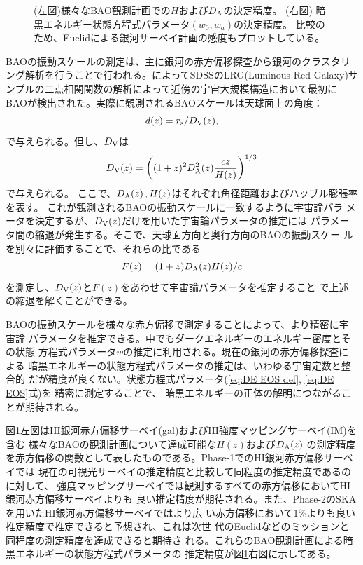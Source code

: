\begin{figure}[t]
\begin{minipage}{0.52\hsize}
\begin{center}
 \end{center}
 \end{minipage}
  \caption{(左図)様々なBAO観測計画での$H$および$D_{\rm A}$の決定精度。 
(右図) 暗黒エネルギー状態方程式パラメータ$(w_0,w_a)$の決定精度。
比較のため、Euclidによる銀河サーベイ計画の感度もプロットしている。\citep{Bull:2015nra}
\label{fig:BAO fig}} 
\end{figure}

BAOの振動スケールの測定は、主に銀河の赤方偏移探査から銀河のクラスタリング解析を行うことで行われる。\cite{2005ApJ...633..560E}によってSDSSのLRG(Luminous Red Galaxy)サンプルの二点相関関数の解析によって近傍の宇宙大規模構造において最初にBAOが検出された。実際に観測されるBAOスケールは天球面上の角度：
\begin{equation}
 d(z) = r_{\rm s}/D_{\rm V}(z),
\end{equation}
で与えられる。但し、$D_{\rm V}$は
\begin{equation}
 D_{\rm V}(z) = \left((1+z)^2D_{\rm A}^2(z)\frac{cz}{H(z)}\right)^{1/3}
\end{equation}
で与えられる。
ここで、$D_{\rm A}(z)\,, H(z)$はそれぞれ角径距離およびハッブル膨張率を表す。
これが観測されるBAOの振動スケールに一致するように宇宙論パラ
メータを決定するが、$D_{\rm V}(z)$だけを用いた宇宙論パラメータの推定には
パラメータ間の縮退が発生する。そこで、天球面方向と奥行方向のBAOの振動スケー
ルを別々に評価することで、それらの比である
\begin{equation}
 F(z) = (1+z)D_{\rm A}(z)H(z)/c
\end{equation}
を測定し、$D_{\rm V}(z)$と$F(z)$をあわせて宇宙論パラメータを推定すること
で上述の縮退を解くことができる。

BAOの振動スケールを様々な赤方偏移で測定することによって、より精密に宇宙論
パラメータを推定できる。中でもダークエネルギーのエネルギー密度とその状態
方程式パラメータ$w$の推定に利用される。現在の銀河の赤方偏移探査による
暗黒エネルギーの状態方程式パラメータの推定は、いわゆる宇宙定数と整合的
だが精度が良くない。状態方程式パラメータ(\eqref{eq:DE EOS def}, \eqref{eq:DE EOS}式)を
精密に測定することで、
暗黒エネルギーの正体の解明につながることが期待される。

\bigskip

図\ref{fig:BAO fig}左図はHI銀河赤方偏移サーベイ(gal)およびHI強度マッピングサーベイ(IM)を含む
様々なBAOの観測計画について達成可能な$H(z)$および$D_{\rm A}(z)$ の測定精度
を赤方偏移の関数として表したものである。Phase-1でのHI銀河赤方偏移サーベイでは
現在の可視光サーベイの推定精度と比較して同程度の推定精度であるのに対して、
強度マッピングサーベイでは観測するすべての赤方偏移においてHI銀河赤方偏移サーベイよりも
良い推定精度が期待される。また、Phase-2のSKAを用いたHI銀河赤方偏移サーベイではより広
い赤方偏移において1\%よりも良い推定精度で推定できると予想され、これは次世
代のEuclidなどのミッションと同程度の測定精度を達成できると期待さ
れる。これらのBAO観測計画による暗黒エネルギーの状態方程式パラメータの
推定精度が図\ref{fig:BAO fig}右図に示してある。

